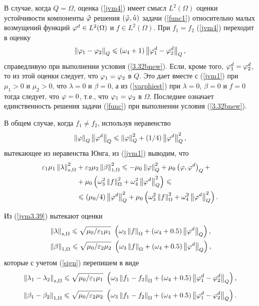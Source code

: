 В случае, когда $Q = \Omega$, оценка (\ref{jvm4}) имеет смысл $L^2 (\Omega)$ оценки устойчивости компоненты $\hat {\varphi}$ решения $\left( \hat {\varphi}, \hat u \right)$ задачи (\ref{func1}) относительно малых возмущений функций $\varphi^d \in L^2 (\Omega)$ и $f \in  L^2 (\Omega)$. При $f_1= f_2$ (\ref{jvm4}) переходит в оценку
\[
	\left\Vert \varphi_1 - \varphi_2 \right\Vert_Q 
	\leqslant 
		\left( \omega_4 + 1 \right) 
		\left\Vert \varphi^d_1 - \varphi^d_2 \right\Vert_Q,
\]
справедливую при выполнении условия (\ref{3.32bnew}). Если, кроме того, $\varphi^d_1 = \varphi^d_2$, то из этой оценки следует, что $\varphi_1 = \varphi_2$ в $Q$. Это дает вместе с (\ref{jvm1}) при $\mu_1 > 0$ и $\mu_2 > 0$, что $\lambda = 0$ и $\beta = 0$, а из (\ref{varphiest}) при $\lambda = 0$, $\beta = 0$ и $f = 0$ тогда следует, что $\varphi = 0$, т.е., что $\varphi_1 = \varphi_2$ в $\Omega$. Последнее означает единственность решения задачи (\ref{func}) при выполнении условия (\ref{3.32bnew}).

В общем случае, когда $f_1 \neq f_2$, используя неравенство 
\[
	\left\Vert \varphi \right\Vert_Q 
	\left\Vert \varphi^d \right\Vert_Q 
	\leqslant 
		\left\Vert \varphi \right\Vert_Q^2 
		+ (1/4) 
		\left\Vert \varphi^d \right\Vert_Q^2,
\] 
вытекающее из неравенства Юнга, из (\ref{jvm1}) выводим, что
\begin{equation}
	\label{jvm3.39}
	\begin{split}
		\varepsilon_1 \mu_1 
		\left\Vert \lambda \right\Vert_{s,\Omega}^2 
		&+ \varepsilon_2 \mu_2 
		\left\Vert \beta \right\Vert_{1,\Omega}^2 
		\leqslant 
			- \mu_0 \left\Vert \varphi \right\Vert_Q^2 
			+ \mu_0 \left( \varphi, \varphi^d \right)_Q + \\
			&+ \mu_0 \left( 
				\omega_3^2 
				\left\Vert f \right\Vert_\Omega^2 
				+ \omega_4^2 
				\left\Vert \varphi^d \right\Vert_Q^2
			 \right) 
		\leqslant \\  
		&\leqslant 
			(\mu_0 /4) 
			\left\Vert \varphi^d \right\Vert_Q^2 
			+ \mu_0 
			\left( 
				\omega_3^2 
				\left\Vert f \right\Vert_\Omega^2 
				+ \omega_4^2 
				\left\Vert \varphi^d \right\Vert_Q^2
			 \right).
	\end{split}
\end{equation}

Из (\ref{jvm3.39}) вытекают оценки 
\[
	\begin{split}
		&\left\Vert \lambda \right\Vert_{s,\Omega} 
		\leqslant 
			\sqrt{\mu_0 / \varepsilon_1 \mu_1} ~
			\left( 
				\omega_3 
				\left\Vert f \right\Vert_\Omega 
				+ \left( \omega_4 + 0.5 \right) 
				\left\Vert \varphi^d \right\Vert_Q
			 \right), \\
		&\left\Vert \beta \right\Vert_{1,\Omega} 
		\leqslant 
			\sqrt{\mu_0 / \varepsilon_2 \mu_2} ~ 
			\left( 
				\omega_3 
				\left\Vert f \right\Vert_\Omega 
				+ \left( \omega_4 + 0.5 \right) 
				\left\Vert \varphi^d \right\Vert_Q
			 \right),
	\end{split}
\] 
которые с учетом (\ref{sign}) перепишем в виде
\begin{equation}
	\label{est_11}
	\left\Vert \lambda_1 - \lambda_2 \right\Vert_{s, \Omega} 
	\leqslant 
		\sqrt{\mu_0 / \varepsilon_1 \mu_1} ~
		\left( 
			\omega_3 \left\Vert f_1 - f_2 \right\Vert_\Omega 
			+ \left( \omega_4 + 0.5 \right) 
			\left\Vert \varphi^d_1 - \varphi^d_2 \right\Vert_Q
		 \right), 
\end{equation}
\begin{equation}
	\label{est_11a}
	\left\Vert \beta_1 - \beta_2 \right\Vert_{1, \Omega}
	\leqslant 
		\sqrt{\mu_0 / \varepsilon_2 \mu_2} ~ 
		\left( 
			\omega_3 \left\Vert f_1 - f_2 \right\Vert_\Omega 
			+ \left( \omega_4 + 0.5 \right) 
			\left\Vert \varphi^d_1 - \varphi^d_2 \right\Vert_Q
		 \right). 
\end{equation}

